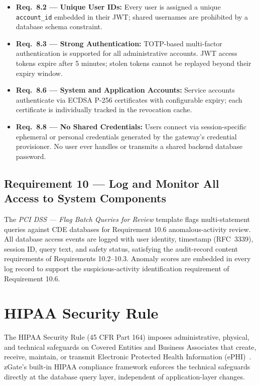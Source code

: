 \begin{itemize}
    \item \textbf{Req.\ 8.2 --- Unique User IDs:} Every user is assigned a unique \texttt{account\_id} embedded in their JWT; shared usernames are prohibited by a database schema constraint.
    \item \textbf{Req.\ 8.3 --- Strong Authentication:} TOTP-based multi-factor authentication is supported for all administrative accounts. JWT access tokens expire after 5 minutes; stolen tokens cannot be replayed beyond their expiry window.
    \item \textbf{Req.\ 8.6 --- System and Application Accounts:} Service accounts authenticate via ECDSA P-256 certificates with configurable expiry; each certificate is individually tracked in the revocation cache.
    \item \textbf{Req.\ 8.8 --- No Shared Credentials:} Users connect via session-specific ephemeral or personal credentials generated by the gateway's credential provisioner. No user ever handles or transmits a shared backend database password.
\end{itemize}

\subsection{Requirement 10 --- Log and Monitor All Access to System Components}

The \textit{PCI DSS --- Flag Batch Queries for Review} template flags multi-statement queries against CDE databases for Requirement 10.6 anomalous-activity review. All database access events are logged with user identity, timestamp (RFC~3339), session ID, query text, and safety status, satisfying the audit-record content requirements of Requirements 10.2--10.3. Anomaly scores are embedded in every log record to support the suspicious-activity identification requirement of Requirement 10.6.

\section{HIPAA Security Rule}

The HIPAA Security Rule (45 CFR Part 164) imposes administrative, physical, and technical safeguards on Covered Entities and Business Associates that create, receive, maintain, or transmit Electronic Protected Health Information (ePHI)~\cite{hipaa-security-rule}. zGate's built-in HIPAA compliance framework enforces the technical safeguards directly at the database query layer, independent of application-layer changes.


